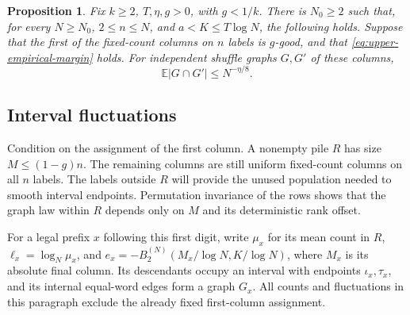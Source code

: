 \documentclass[11pt]{article}
\numberwithin{equation}{section}
\newtheorem{proposition}[theorem]{Proposition}
\theoremstyle{definition}
\theoremstyle{remark}
\newcommand{\E}{\mathbb E}
\newcommand{\1}{\mathbf 1}
\begin{document}
\begin{proposition}%
\label{prop:upper-first}
Fix $k\ge2$, $T,\eta,g>0$, with $g<1/k$. There is $N_0\ge2$ such
that, for every $N\ge N_0$, $2\le n\le N$, and
$a<K\le T\log N$, the following holds. Suppose that the first of
the fixed-count columns on $n$ labels is $g$-good, and that
\eqref{eq:upper-empirical-margin} holds. For independent shuffle
graphs $G,G'$ of these columns,
\begin{equation}\label{eq:upper-first}
 \E|G\cap G'|\le N^{-\eta/8}.
\end{equation}
\end{proposition}

\subsection{Interval fluctuations}
Condition on the assignment of the first column. A nonempty pile
$R$ has size $M\le(1-g)n$. The remaining columns are still uniform
fixed-count columns on all $n$ labels. The labels outside $R$ will
provide the unused population needed to smooth interval endpoints.
Permutation invariance of the rows shows that the graph law within
$R$ depends only on $M$ and its deterministic rank offset.

For a legal prefix $x$ following this first digit, write $\mu_x$ for
its mean count in $R$, $\ell_x=\log_N\mu_x$, and
$e_x=-B^{(N)}_2(M_x/\log N,K/\log N)$, where $M_x$ is its absolute final column.
Its descendants occupy an interval with endpoints $\iota_x,\tau_x$,
and its internal equal-word edges form a graph $G_x$.
All counts and fluctuations in this paragraph exclude the already
fixed first-column assignment.
\end{document}
